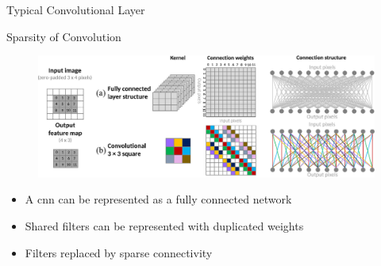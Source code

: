 \documentclass[t,xcolor=dvipsnames]{beamer}
\begin{document}
\begin{frame}{Typical Convolutional Layer}
\begin{figure}
{
    }
\end{figure}
\end{frame}

\begin{frame}{Sparsity of Convolution}
\begin{figure}
    \includegraphics[width=\textwidth]{../Figs/PDF/sparseconn4}
\end{figure}
\begin{itemize}
    \item A \gls{cnn} can be represented as a fully connected network
    \item Shared filters can be represented with duplicated weights
    \item Filters replaced by sparse connectivity
\end{itemize}
\end{frame}

\end{document}
